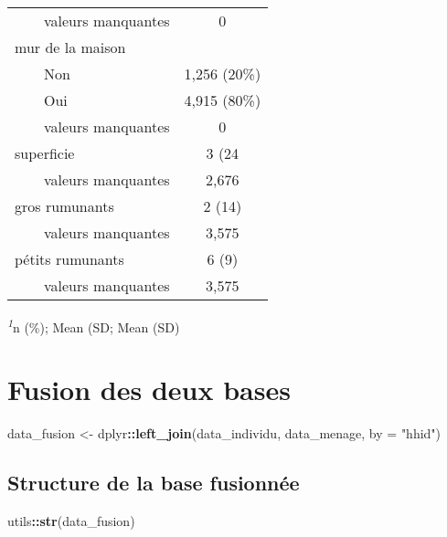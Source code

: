 \documentclass[
]{article}
\newenvironment{Shaded}{\begin{snugshade}}{\end{snugshade}}
\newcommand{\AttributeTok}[1]{\textcolor[rgb]{0.13,0.29,0.53}{#1}}
\newcommand{\FunctionTok}[1]{\textcolor[rgb]{0.13,0.29,0.53}{\textbf{#1}}}
\newcommand{\NormalTok}[1]{#1}
\newcommand{\OtherTok}[1]{\textcolor[rgb]{0.56,0.35,0.01}{#1}}
\newcommand{\SpecialCharTok}[1]{\textcolor[rgb]{0.81,0.36,0.00}{\textbf{#1}}}
\newcommand{\StringTok}[1]{\textcolor[rgb]{0.31,0.60,0.02}{#1}}
\begin{document}
\begin{table}[!t]
\begin{tabular*}{\linewidth}{@{\extracolsep{\fill}}lc}
    valeurs manquantes & 0 \\ 
mur de la maison &  \\ 
    Non & 1,256 (20\%) \\ 
    Oui & 4,915 (80\%) \\ 
    valeurs manquantes & 0 \\ 
superficie & 3 (24 \\ 
    valeurs manquantes & 2,676 \\ 
gros rumunants & 2 (14) \\ 
    valeurs manquantes & 3,575 \\ 
pétits rumunants & 6 (9) \\ 
    valeurs manquantes & 3,575 \\ 
\bottomrule
\end{tabular*}
\begin{minipage}{\linewidth}
\textsuperscript{\textit{1}}n (\%); Mean (SD; Mean (SD)\\
\end{minipage}
\end{table}

\section{Fusion des deux bases}\label{fusion-des-deux-bases}

\begin{Shaded}
\begin{Highlighting}[]
\NormalTok{data\_fusion }\OtherTok{\textless{}{-}}\NormalTok{ dplyr}\SpecialCharTok{::}\FunctionTok{left\_join}\NormalTok{(data\_individu, data\_menage, }\AttributeTok{by =} \StringTok{"hhid"}\NormalTok{)}
\end{Highlighting}
\end{Shaded}

\subsection{Structure de la base
fusionnée}\label{structure-de-la-base-fusionnuxe9e}

\begin{Shaded}
\begin{Highlighting}[]
\NormalTok{utils}\SpecialCharTok{::}\FunctionTok{str}\NormalTok{(data\_fusion)}
\end{Highlighting}
\end{Shaded}
\end{document}
